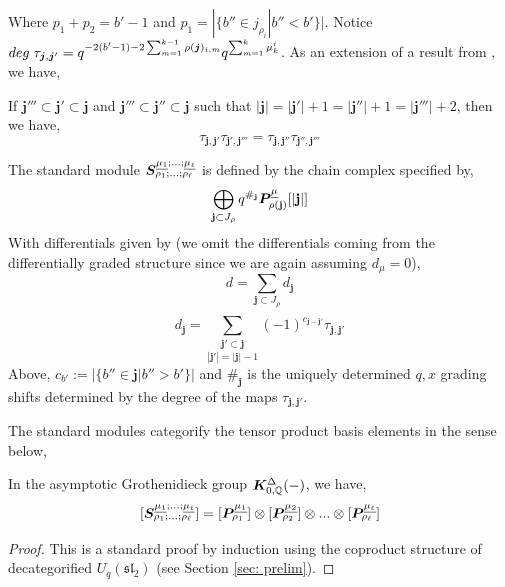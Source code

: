 \documentclass{article}
\begin{document}
Where $p_1+p_2 = b'-1$ and $p_1 = |\{b'' \in j_{\rho_i}| b''<b'\}|$. Notice $deg\hspace{1mm}\tau_{\boldsymbol{j},\boldsymbol{j}'} = q^{-2(b'-1)-2\sum^{k-1}_{m=1}\rho(\boldsymbol{j})_{i,m}}q^{\sum^k_{m=1} \mu^i_k}$. As an extension of a result from \cite{Na}, we have, 
\begin{lem} \cite{Na}
    If $\boldsymbol{j}''' \subset \boldsymbol{j}' \subset \boldsymbol{j}$ and $\boldsymbol{j}''' \subset \boldsymbol{j}'' \subset \boldsymbol{j}$ such that $|\boldsymbol{j} | = |\boldsymbol{j}'|+1 = |\boldsymbol{j}''|+1 = |\boldsymbol{j}'''|+2$, then we have, 
    $$\tau_{\mathbf{j},\mathbf{j'}} \tau_{\mathbf{j}',\mathbf{j}'''} = \tau_{\mathbf{j},\mathbf{j}''} \tau_{\mathbf{j}'',\mathbf{j}'''} $$
\end{lem}

\begin{defn} \cite{Na}
    The standard module ${\boldsymbol{S}}^{\underline{\mu_1}; ... ;\underline{\mu_\ell}}_{\rho_1;...;\rho_\ell}$ is defined by the chain complex specified by, 
    $$\bigoplus_{\mathbf{j}\subset J_\rho} q^{\#_{\mathbf{j}}}{\boldsymbol{P}}^{\underline{\mu}}_{\rho(\mathbf{j})} [|\mathbf{j}|]$$
    With differentials given by (we omit the differentials coming from the differentially graded structure since we are again assuming $d_\mu =0$),
    $$d = \underset{}{\sum_{\boldsymbol{j}\subset J_\rho}} d_{\boldsymbol{j}}$$
    $$d_{\boldsymbol{j}} = \underset{|\boldsymbol{j}'|= |\boldsymbol{j}|-1}{\sum_{\boldsymbol{j}' \subset\boldsymbol{j}}} (-1)^{c_{\boldsymbol{j}-\boldsymbol{j}'}} \tau_{\boldsymbol{j},\boldsymbol{j}'}$$
    Above, $c_{b'} := |\{b'' \in \boldsymbol{j} | b''>b'\}|$ and $\#_{\boldsymbol{j}}$ is the uniquely determined $q,x$ grading shifts determined by the degree of the maps $\tau_{\boldsymbol{j},\boldsymbol{j}'}$. 
\end{defn}
The standard modules categorify the tensor product basis elements in the sense below, 
\begin{prop}
    In the asymptotic Grothenidieck group $\boldsymbol{K}^\Delta_{0,{\mathbb Q}}(-)$, we have, 
    $$[{\boldsymbol{S}}^{\underline{\mu_1}; ... ;\underline{\mu_\ell}}_{\rho_1;...;\rho_\ell}] = [{\boldsymbol{P}}^{\underline{\mu_1}}_{\rho_1}]\otimes [{\boldsymbol{P}}^{\underline{\mu_2}}_{\rho_2}] \otimes ... \otimes [{\boldsymbol{P}}^{\underline{\mu_\ell}}_{\rho_\ell}]$$
\end{prop}
\begin{proof}
    This is a standard proof by induction using the coproduct structure of decategorified $U_q(\mathfrak{sl}_2)$ (see Section \ref{sec: prelim}). 
\end{proof}
\end{document}
